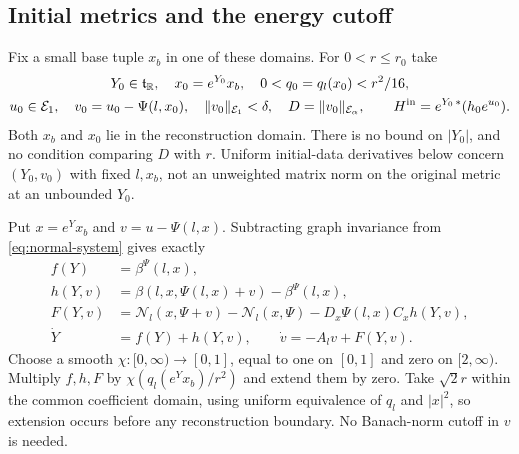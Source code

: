 \documentclass[11pt]{amsart}
\theoremstyle{definition}
\theoremstyle{remark}
\newcommand{\RR}{\mathbb R}
\begin{document}
\subsection{Initial metrics and the energy cutoff}
Fix a small base tuple $x_b$ in one of these domains. For
$0<r\le r_0$ take
\begin{equation}\label{eq:initial-class}
 \begin{gathered}
 Y_0\in\mathfrak t_{\RR},\quad x_0=e^{Y_0}x_b,\quad
             0<q_0=q_l(x_0)<r^2/16,\\
 u_0\in\mathcal E_1,\quad v_0=u_0-\Psi(l,x_0),\quad
 \|v_0\|_{\mathcal E_1}<\delta,\quad
 D=\|v_0\|_{\mathcal E_\alpha},\qquad
 H^{\rm in}=e^{Y_0\,*}(h_0e^{u_0}).
 \end{gathered}
\end{equation}
Both $x_b$ and $x_0$ lie in the reconstruction domain.
There is no bound on $|Y_0|$, and no condition comparing $D$
with $r$. Uniform initial-data derivatives below concern
$(Y_0,v_0)$ with fixed $l,x_b$, not an unweighted matrix norm
on the original metric at an unbounded $Y_0$.

Put $x=e^Yx_b$ and $v=u-\Psi(l,x)$. Subtracting graph invariance
from \eqref{eq:normal-system} gives exactly
\begin{equation}\label{eq:phase-system}
 \begin{aligned}
 f(Y)&=\beta^\Psi(l,x),\\
 h(Y,v)&=\beta(l,x,\Psi(l,x)+v)-\beta^\Psi(l,x),\\
 F(Y,v)&=\mathcal N_l(x,\Psi+v)-\mathcal N_l(x,\Psi)
                            -D_x\Psi(l,x)C_xh(Y,v),\\
 \dot Y&=f(Y)+h(Y,v),\qquad \dot v=-A_lv+F(Y,v).
 \end{aligned}
\end{equation}
Choose a smooth $\chi:[0,\infty)\to[0,1]$, equal to one
on $[0,1]$ and zero on $[2,\infty)$. Multiply $f,h,F$ by
$\chi(q_l(e^Yx_b)/r^2)$ and extend them by zero.
Take $\sqrt2r$ within the common coefficient domain, using
uniform equivalence of $q_l$ and $|x|^2$, so extension occurs
before any reconstruction boundary. No Banach-norm cutoff
in $v$ is needed.
\end{document}
